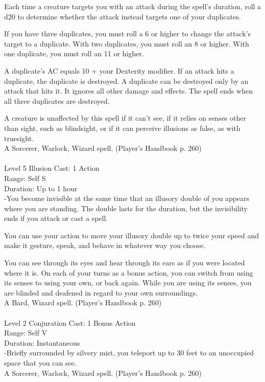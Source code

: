 \documentclass[10pt,twocolumn]{report}
\begin{document}
Each time a creature targets you with an attack during the spell’s duration, roll a d20 to determine whether the attack instead targets one of your duplicates.

If you have three duplicates, you must roll a 6 or higher to change the attack’s target to a duplicate. With two duplicates, you must roll an 8 or higher. With one duplicate, you must roll an 11 or higher.

A duplicate’s AC equals 10 + your Dexterity modifier. If an attack hits a duplicate, the duplicate is destroyed. A duplicate can be destroyed only by an attack that hits it. It ignores all other damage and effects. The spell ends when all three duplicates are destroyed.

A creature is unaffected by this spell if it can’t see, if it relies on senses other than sight, such as blindsight, or if it can perceive illusions as false, as with truesight.\\
A Sorcerer, Warlock, Wizard spell. (Player's Handbook p. 260) \\


 \\
Level 5 \quad Illusion \quad Cast: 1 Action\\
Range: Self \quad S\\
Duration: Up to 1 hour \quad \\
-You become invisible at the same time that an illusory double of you appears where you are standing. The double lasts for the duration, but the invisibility ends if you attack or cast a spell.

You can use your action to move your illusory double up to twice your speed and make it gesture, speak, and behave in whatever way you choose.

You can see through its eyes and hear through its ears as if you were located where it is. On each of your turns as a bonus action, you can switch from using its senses to using your own, or back again. While you are using its senses, you are blinded and deafened in regard to your own surroundings.\\
A Bard, Wizard spell. (Player's Handbook p. 260) \\


 \\
Level 2 \quad Conjuration \quad Cast: 1 Bonus Action\\
Range: Self \quad V\\
Duration: Instantaneous \quad \\
-Briefly surrounded by silvery mist, you teleport up to 30 feet to an unoccupied space that you can see.\\
A Sorcerer, Warlock, Wizard spell. (Player's Handbook p. 260) \\
\end{document}
